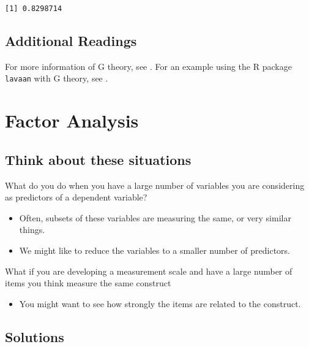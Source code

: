 \documentclass[
]{book}
\providecommand{\tightlist}{%
  \setlength{\itemsep}{0pt}\setlength{\parskip}{0pt}}
\begin{document}
\begin{verbatim}
[1] 0.8298714
\end{verbatim}

\hypertarget{additional-readings}{%
\section{Additional Readings}\label{additional-readings}}

For more information of G theory, see \citet{raykov2011introduction}.
For an example using the R package \texttt{lavaan} with G theory, see \citet{Jorgensen2021Howestimateabsolute}.

\hypertarget{factor-analysis}{%
\chapter{Factor Analysis}\label{factor-analysis}}

\hypertarget{think-about-these-situations}{%
\section{Think about these situations}\label{think-about-these-situations}}

What do you do when you have a large number of variables you are considering as predictors of a dependent variable?

\begin{itemize}
\tightlist
\item
  Often, subsets of these variables are measuring the same, or very similar things.
\item
  We might like to reduce the variables to a smaller number of predictors.
\end{itemize}

What if you are developing a measurement scale and have a large number of items you think measure the same construct

\begin{itemize}
\tightlist
\item
  You might want to see how strongly the items are related to the construct.
\end{itemize}

\hypertarget{solutions}{%
\section{Solutions}\label{solutions}}
\end{document}
